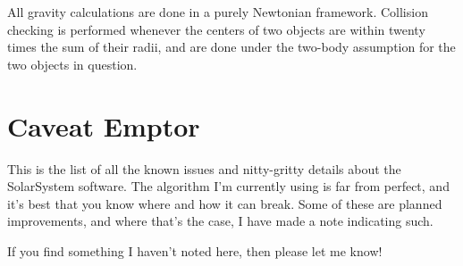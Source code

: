 \documentclass{article}
\begin{document}
All gravity calculations are done in a purely Newtonian framework.  Collision checking is performed whenever the centers of two objects are within twenty times the sum of their radii, and are done under the two-body assumption for the two objects in question.

\section{Caveat Emptor}

This is the list of all the known issues and nitty-gritty details about the SolarSystem software.  The algorithm I'm currently using is far from perfect, and it's best that you know where and how it can break.  Some of these are planned improvements, and where that's the case, I have made a note indicating such.

If you find something I haven't noted here, then please let me know!
\end{document}
